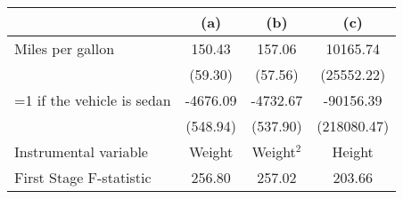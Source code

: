 \begin{tabular}{lccc}
\toprule
 & (a) & (b) & (c) \\
\midrule
Miles per gallon & 150.43 & 157.06 & 10165.74 \\
  & (59.30) & (57.56) & (25552.22) \\
=1 if the vehicle is sedan & -4676.09 & -4732.67 & -90156.39 \\
  & (548.94) & (537.90) & (218080.47) \\
\midrule Instrumental variable & Weight & Weight$^2$ & Height \\
First Stage F-statistic & 256.80 & 257.02 & 203.66 \\
\bottomrule
\end{tabular}
